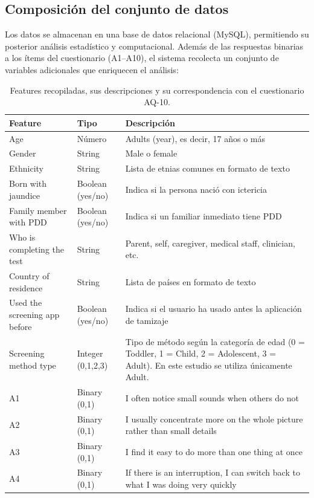 \subsection{Composición del conjunto de datos}

Los datos se almacenan en una base de datos relacional (MySQL), permitiendo su posterior análisis estadístico y computacional. Además de las respuestas binarias a los ítems del cuestionario (A1--A10), el sistema recolecta un conjunto de variables adicionales que enriquecen el análisis:

\begin{table}[htbp]
\centering
\caption{Features recopiladas, sus descripciones y su correspondencia con el cuestionario AQ-10.}
\begin{tabularx}{\textwidth}{l l X}
\toprule
\textbf{Feature} & \textbf{Tipo} & \textbf{Descripción} \\
\midrule
Age & Número & Adults (year), es decir, 17 años o más \\
Gender & String & Male o female \\
Ethnicity & String & Lista de etnias comunes en formato de texto \\
Born with jaundice & Boolean (yes/no) & Indica si la persona nació con ictericia \\
Family member with PDD & Boolean (yes/no) & Indica si un familiar inmediato tiene PDD \\
Who is completing the test & String & Parent, self, caregiver, medical staff, clinician, etc. \\
Country of residence & String & Lista de países en formato de texto \\
Used the screening app before & Boolean (yes/no) & Indica si el usuario ha usado antes la aplicación de tamizaje \\
Screening method type & Integer (0,1,2,3) & Tipo de método según la categoría de edad (0 = Toddler, 1 = Child, 2 = Adolescent, 3 = Adult). En este estudio se utiliza únicamente Adult. \\
A1 & Binary (0,1) & I often notice small sounds when others do not \\
A2 & Binary (0,1) & I usually concentrate more on the whole picture rather than small details \\
A3 & Binary (0,1) & I find it easy to do more than one thing at once \\
A4 & Binary (0,1) & If there is an interruption, I can switch back to what I was doing very quickly \\

\end{tabularx}
\end{table}
